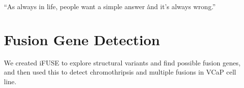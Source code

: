 \begin{savequote}[75mm]
“As always in life, people want a simple answer \. \. \. and it’s always wrong.”
\end{savequote}

\chapter{Fusion Gene Detection}\label{chapter:fusiongenes}
\setcounter{figure}{-1}
\setcounter{table}{-1}
\setcounter{section}{-1}

We created iFUSE to explore structural variants and find possible fusion genes, and then used this to detect chromothripsis and multiple fusions in VCaP cell line.

